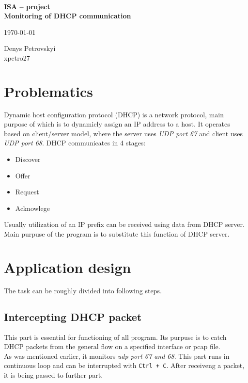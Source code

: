 \documentclass[english]{fitiel} %
\begin{document}
	
	\begin{titlepage}
		\begin{center}
			\logo\\\vspace{150pt}
			\LARGE\textbf{ISA -- project\\Monitoring of DHCP communication}
		\end{center}
		\null\vfill
		\begin{flushleft}
		\today
		\end{flushleft}
		\begin{flushright}
			Denys Petrovskyi\\
			xpetro27
		\end{flushright}
	\end{titlepage}

	\newpage
	\tableofcontents
	\newpage
	
	\section{Problematics}
	Dynamic host configuration protocol (DHCP) is a network protocol, main purpose of which is to 
	dynamicly assign an IP address to a host. It operates based on client/server model, where the server uses \emph{UDP port 67}
	and client uses \emph{UDP port 68}. DHCP communicates in 4 stages:\cite{Microsoft}
	\begin{itemize}
		\item Discover
		\item Offer
		\item Request
		\item Acknowlege
	\end{itemize}
	Usually utilization of an IP prefix can be received using data from DHCP server. Main purpuse of the program is to substitute 
	this function of DHCP server. 

	\section{Application design}
	The task can be roughly divided into following steps.

	\subsection{Intercepting DHCP packet}
	This part is essential for functioning of all program. Its purpuse is to catch DHCP packets from the general flow
	on a specified interface or pcap file.\\As was mentioned earlier, it monitors \emph{udp port 67 and 68}. 
	This part runs in continuous loop and can be interrupted with \verb|Ctrl + C|. After receiveng a packet, it is being passed 
	to further part.
\end{document}
